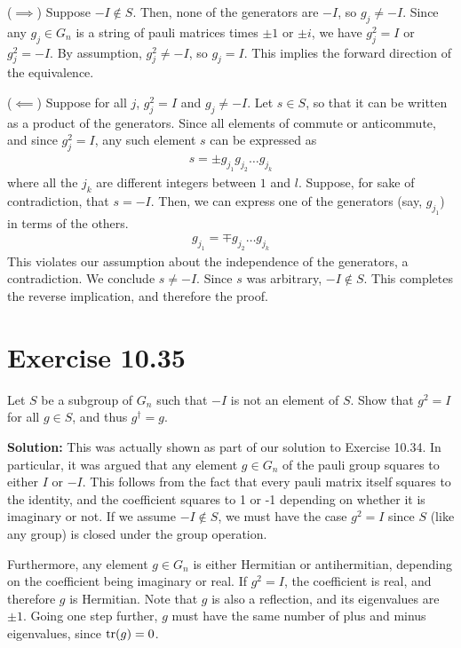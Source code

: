\documentclass{book}
\begin{document}
    ($\implies$) Suppose $-I \notin S$. Then, none of the generators are $-I$, so $g_j \neq -I$. Since any $g_j \in G_n$ is a string of pauli matrices times $\pm 1$ or $\pm i$, we have $g_j^2 = I$ or $g_j^2 = -I$. By assumption, $g_j^2 \neq -I$, so $g_j = I$. This implies the forward direction of the equivalence.
    
    ($\impliedby$) Suppose for all $j$, $g_j^2 = I$ and $g_j \neq -I$. Let $s \in S$, so that it can be written as a product of the generators. Since all elements of commute or anticommute, and since $g_j^2 = I$, any such element $s$ can be expressed as 
    \begin{align}
        s = \pm g_{j_1}g_{j_2}\dots g_{j_k}
    \end{align}
    where all the $j_k$ are different integers between $1$ and $l$. Suppose, for sake of contradiction, that $s = -I$. Then, we can express one of the generators (say, $g_{j_1}$) in terms of the others.
    \begin{align}
        g_{j_1} = \mp g_{j_2}\dots g_{j_k}
    \end{align}
    This violates our assumption about the independence of the generators, a contradiction. We conclude $s \neq -I$. Since $s$ was arbitrary, $-I \notin S$. This completes the reverse implication, and therefore the proof.
    
\section*{Exercise 10.35}
    Let $S$ be a subgroup of $G_n$ such that $-I$ is not an element of $S$. Show that $g^2 =I$ for all $g\in S$, and thus $g^\dagger = g$.
    
    \textbf{Solution:} This was actually shown as part of our solution to Exercise 10.34. In particular, it was argued that any element $g \in G_n$ of the pauli group squares to either $I$ or $-I$. This follows from the fact that every pauli matrix itself squares to the identity, and the coefficient squares to 1 or -1 depending on whether it is imaginary or not. If we assume $-I\notin S$, we must have the case $g^2 = I$ since $S$ (like any group) is closed under the group operation. 
    
    Furthermore, any element $g\in G_n$ is either Hermitian or antihermitian, depending on the coefficient being imaginary or real. If $g^2 = I$, the coefficient is real, and therefore $g$ is Hermitian. Note that $g$ is also a reflection, and its eigenvalues are $\pm 1$. Going one step further, $g$ must have the same number of plus and minus eigenvalues, since $\tr(g) = 0$.
    
\end{document}

